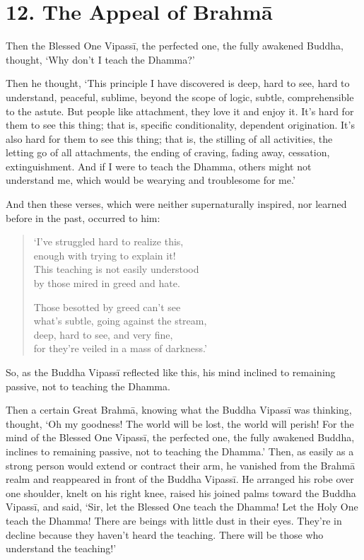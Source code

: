 \documentclass[12pt,openany]{book}%
\begin{document}
\section*{12. The Appeal of \textsanskrit{Brahmā} }

Then the Blessed One \textsanskrit{Vipassī}, the perfected one, the fully awakened Buddha, thought, ‘Why don’t I teach the Dhamma?’ 

Then he thought, ‘This principle I have discovered is deep, hard to see, hard to understand, peaceful, sublime, beyond the scope of logic, subtle, comprehensible to the astute. But people like attachment, they love it and enjoy it. It’s hard for them to see this thing; that is, specific conditionality, dependent origination. It’s also hard for them to see this thing; that is, the stilling of all activities, the letting go of all attachments, the ending of craving, fading away, cessation, extinguishment. And if I were to teach the Dhamma, others might not understand me, which would be wearying and troublesome for me.’ 

And then these verses, which were neither supernaturally inspired, nor learned before in the past, occurred to him: 

\begin{verse}%
‘I’ve struggled hard to realize this, \\
enough with trying to explain it! \\
This teaching is not easily understood \\
by those mired in greed and hate. 

Those besotted by greed can’t see \\
what’s subtle, going against the stream, \\
deep, hard to see, and very fine, \\
for they’re veiled in a mass of darkness.’ 

%
\end{verse}

So, as the Buddha \textsanskrit{Vipassī} reflected like this, his mind inclined to remaining passive, not to teaching the Dhamma. 

Then a certain Great \textsanskrit{Brahmā}, knowing what the Buddha \textsanskrit{Vipassī} was thinking, thought, ‘Oh my goodness! The world will be lost, the world will perish! For the mind of the Blessed One \textsanskrit{Vipassī}, the perfected one, the fully awakened Buddha, inclines to remaining passive, not to teaching the Dhamma.’ Then, as easily as a strong person would extend or contract their arm, he vanished from the \textsanskrit{Brahmā} realm and reappeared in front of the Buddha \textsanskrit{Vipassī}. He arranged his robe over one shoulder, knelt on his right knee, raised his joined palms toward the Buddha \textsanskrit{Vipassī}, and said, ‘Sir, let the Blessed One teach the Dhamma! Let the Holy One teach the Dhamma! There are beings with little dust in their eyes. They’re in decline because they haven’t heard the teaching. There will be those who understand the teaching!’ 
\end{document}
